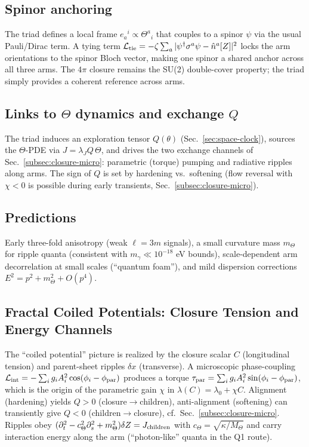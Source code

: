 \documentclass[11pt]{article}
\begin{document}
\subsection{Spinor anchoring}
The triad defines a local frame $e_a{}^i\!\propto\!\Theta^a{}_i$ that couples to a spinor $\psi$ via the usual Pauli/Dirac term.
A tying term $\mathcal L_{\rm tie}=-\zeta\sum_a |\psi^\dagger\sigma^a\psi - \hat n^a[Z]|^2$ locks the arm orientations to the spinor Bloch vector, making one spinor a shared anchor across all three arms. The $4\pi$ closure remains the SU(2) double-cover property; the triad simply provides a coherent reference across arms.

\subsection{Links to $\Theta$ dynamics and exchange $Q$}
The triad induces an exploration tensor $Q(\theta)$ (Sec.~\ref{sec:space-clock}), sources the $\Theta$-PDE via $J=\lambda_J Q\,\Theta$, and drives the two exchange channels of Sec.~\ref{subsec:closure-micro}: parametric (torque) pumping and radiative ripples along arms. The sign of $Q$ is set by hardening vs.\ softening (flow reversal with $\chi<0$ is possible during early transients, Sec.~\ref{subsec:closure-micro}).

\subsection{Predictions}
Early three-fold anisotropy (weak $\ell\!=\!3m$ signals), a small curvature mass $m_\Theta$ for ripple quanta (consistent with $m_\gamma\!\ll\!10^{-18}$ eV bounds), scale-dependent arm decorrelation at small scales (``quantum foam''), and mild dispersion corrections $E^2=p^2+m_\Theta^2+O(p^4)$.


\subsection{Fractal Coiled Potentials: Closure Tension and Energy Channels}
The ``coiled potential'' picture is realized by the closure scalar $C$ (longitudinal tension) and parent-sheet ripples $\delta x$ (transverse). A microscopic phase-coupling
$\mathcal L_{\rm int}=-\sum_i g_i A_i^2\cos(\phi_i-\phi_{\rm par})$ produces a torque $\tau_{\rm par}=\sum_i g_i A_i^2\sin(\phi_i-\phi_{\rm par})$,
which is the origin of the parametric gain $\chi$ in $\lambda(C)=\lambda_0+\chi C$.
Alignment (hardening) yields $Q>0$ (closure$\to$children), anti-alignment (softening) can transiently give $Q<0$ (children$\to$closure), cf.\ Sec.~\ref{subsec:closure-micro}.
Ripples obey $(\partial_t^2-c_\Theta^2\partial_s^2+m_\Theta^2)\delta Z=J_{\rm children}$ with $c_\Theta=\sqrt{\kappa/M_\Theta}$ and carry interaction energy along the arm (``photon-like'' quanta in the Q1 route).
\end{document}

